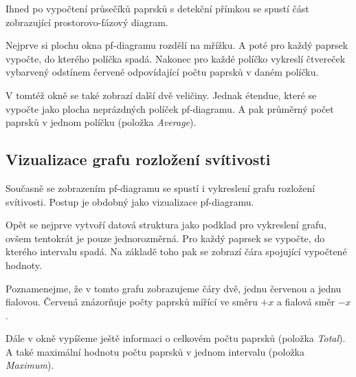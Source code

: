 Ihned po vypočtení průsečíků paprsků s detekční přímkou se spustí část zobrazující prostorovo-fázový diagram.

Nejprve si plochu okna pf-diagramu rozdělí na mřížku. A poté pro každý paprsek vypočte, do kterého políčka spadá. Nakonec pro každé políčko vykreslí čtvereček vybarvený odstínem červené odpovídající počtu paprsků v daném políčku.

V tomtéž okně se také zobrazí další dvě veličiny. Jednak étendue, které se vypočte jako plocha neprázdných políček pf-diagramu. A pak průměrný počet paprsků v jednom políčku (položka \emph{Average}).


\subsection{Vizualizace grafu rozložení svítivosti}

Současně se zobrazením pf-diagramu se spustí i vykreslení grafu rozložení svítivosti. Postup je obdobný jako vizualizace pf-diagramu.

Opět se nejprve vytvoří datová struktura jako podklad pro vykreslení grafu, ovšem tentokrát je pouze jednorozměrná. Pro každý paprsek se vypočte, do kterého intervalu spadá. Na základě toho pak se zobrazí čára spojující vypočtené hodnoty.

Poznamenejme, že v tomto grafu zobrazujeme čáry dvě, jednu červenou a jednu fialovou. Červená znázorňuje počty paprsků mířící ve směru $+x$ a fialová směr $-x$.

Dále v okně vypíšeme ještě informaci o celkovém počtu paprsků (položka \emph{Total}). A také maximální hodnotu počtu paprsků v jednom intervalu (položka \emph{Maximum}).

